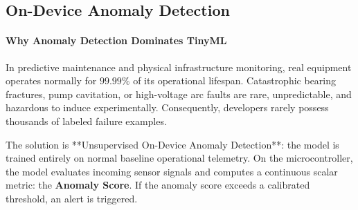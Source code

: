 \subsection{On-Device Anomaly Detection}\label{subsec:anomaly_detection_mcu}

\paragraph{Why Anomaly Detection Dominates TinyML}
In predictive maintenance and physical infrastructure monitoring, real equipment operates normally for $99.99\%$ of its operational lifespan. Catastrophic bearing fractures, pump cavitation, or high-voltage arc faults are rare, unpredictable, and hazardous to induce experimentally. Consequently, developers rarely possess thousands of labeled failure examples.

The solution is **Unsupervised On-Device Anomaly Detection**: the model is trained entirely on normal baseline operational telemetry. On the microcontroller, the model evaluates incoming sensor signals and computes a continuous scalar metric: the \textbf{Anomaly Score}. If the anomaly score exceeds a calibrated threshold, an alert is triggered.

